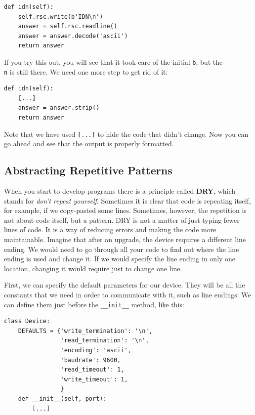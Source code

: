 \begin{verbatim}
def idn(self):
    self.rsc.write(b'IDN\n')
    answer = self.rsc.readline()
    answer = answer.decode('ascii')
    return answer
\end{verbatim}

If you try this out, you will see that it took care of the initial \texttt{b}, but the \texttt{\\n} is still there. We need one more step to get rid of it:

\begin{verbatim}
def idn(self):
    [...]
    answer = answer.strip()
    return answer
\end{verbatim}

Note that we have used \texttt{[...]} to hide the code that didn't change. Now you can go ahead and see that the output is properly formatted.


\subsection{Abstracting Repetitive Patterns}
When you start to develop programs there is a principle called \textbf{DRY}, which stands for \emph{don't repeat yourself}. Sometimes it is clear that code is repeating itself, for example, if we copy-pasted some lines. Sometimes, however, the repetition is not about code itself, but a pattern. {DRY} is not a matter of just typing fewer lines of code. It is a way of reducing errors and making the code more maintainable. Imagine that after an upgrade, the device requires a different line ending. We would need to go through all your code to find out where the line ending is used and change it. If we would specify the line ending in only one location, changing it would require just to change one line.

First, we can specify the default parameters for our device. They will be all the constants that we need in order to communicate with it, such as line endings. We can define them just before the \texttt{__init__} method, like this:

\begin{verbatim}
class Device:
    DEFAULTS = {'write_termination': '\n',
                'read_termination': '\n',
                'encoding': 'ascii',
                'baudrate': 9600,
                'read_timeout': 1,
                'write_timeout': 1,
                }
    def __init__(self, port):
        [...]
\end{verbatim}

